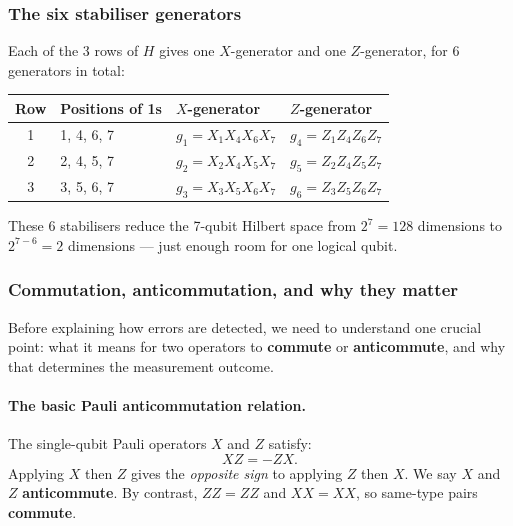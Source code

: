 \documentclass[11pt, a4paper]{article}
\theoremstyle{definition}
\theoremstyle{plain}
\theoremstyle{remark}
\begin{document}
\subsubsection{The six stabiliser generators}

Each of the 3 rows of $H$ gives one $X$-generator and one
$Z$-generator, for 6 generators in total:

\medskip
\begin{center}
\renewcommand{\arraystretch}{1.6}
\begin{tabular}{@{} c l l l @{}}
  \toprule
  \textbf{Row} & \textbf{Positions of 1s}
               & \textbf{$X$-generator}
               & \textbf{$Z$-generator}\\
  \midrule
  1 & 1, 4, 6, 7 & $g_1 = X_1 X_4 X_6 X_7$ & $g_4 = Z_1 Z_4 Z_6 Z_7$\\
  2 & 2, 4, 5, 7 & $g_2 = X_2 X_4 X_5 X_7$ & $g_5 = Z_2 Z_4 Z_5 Z_7$\\
  3 & 3, 5, 6, 7 & $g_3 = X_3 X_5 X_6 X_7$ & $g_6 = Z_3 Z_5 Z_6 Z_7$\\
  \bottomrule
\end{tabular}
\end{center}

\medskip\noindent
These 6 stabilisers reduce the 7-qubit Hilbert space from
$2^7 = 128$ dimensions to $2^{7-6} = 2$ dimensions --- just enough
room for one logical qubit.

\subsubsection{Commutation, anticommutation, and why they matter}

Before explaining how errors are detected, we need to understand one
crucial point: what it means for two operators to \textbf{commute} or
\textbf{anticommute}, and why that determines the measurement outcome.

\paragraph{The basic Pauli anticommutation relation.}
The single-qubit Pauli operators $X$ and $Z$ satisfy:
\[
  XZ = -ZX.
\]
Applying $X$ then $Z$ gives the \emph{opposite sign} to applying $Z$
then $X$.  We say $X$ and $Z$ \textbf{anticommute}.  By contrast,
$ZZ = ZZ$ and $XX = XX$, so same-type pairs \textbf{commute}.
\end{document}
